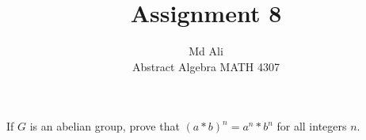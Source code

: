 \documentclass[12pt]{article}
\newenvironment{problem}[2][Problem]{\begin{trivlist}
\item[\hskip \labelsep {\bfseries #1}\hskip \labelsep {\bfseries #2.}]}{\end{trivlist}}
\begin{document}
 
 
\title{Assignment 8}%
\author{Md Ali\\ %
Abstract Algebra MATH 4307} %
 
\maketitle
 
\begin{problem}{2.1.8} %
If $G$ is an abelian group, prove that $(a*b)^n=a^n*b^n$ for all integers $n$.
\end{problem}
 
\end{document}
